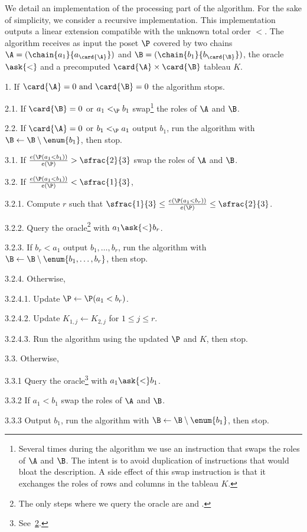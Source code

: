 We detail an implementation of the processing part of the algorithm. For the sake of simplicity,
we consider a recursive implementation. This implementation outputs a linear
extension compatible with the unknown total order \(<\). The algorithm receives as
input the poset \(\P\) covered by two chains \(\A =
(\chain{a_1}{a_{\card{\A}}})\) and \(\B = (\chain{b_1}{b_{\card{\B}}})\), the oracle
\(\ask{<}\) and a precomputed \(\card{\A} \times \card{\B}\) tableau \(K\).
\begin{algorithm}
\item[1.] If \(\card{\A} = 0 \text{ and } \card{\B} = 0\) the algorithm stops.
\item[2.1.] If \(\card{\B} = 0\) or \(a_1 <_{\P} b_1\) swap\footnote{Several times during the algorithm we use an instruction that swaps the
roles of \(\A\) and \(\B\). The intent is to avoid duplication of
instructions that would bloat the description. A side effect of this swap
instruction is that it exchanges
the roles of rows and columns in the tableau \(K\).}
the roles of \(\A\) and \(\B\).
\item[2.2.] If \(\card{\A} = 0\) or \(b_1 <_{\P} a_1\) output
\(b_1\), run the
algorithm with \(\B \gets \B \setminus \enum{b_1}\), then stop.
\item[3.1.] If \(\frac{e(\P(a_1 < b_1))}{e(\P)} > \sfrac{2}{3}\) swap the
roles of \(\A\) and \(\B\).
\item[3.2.] If \(\frac{e(\P(a_1 < b_1))}{e(\P)} < \sfrac{1}{3}\),
\item[3.2.1.] Compute \(r\) such that \(\sfrac{1}{3} \le \frac{e(\P(a_1 < b_r))}{e(\P)} \le \sfrac{2}{3}\).
\item[3.2.2.] Query the oracle\footnote{The only steps where we query the
oracle are  and
.\label{footnote:linial:query}} with \(a_1 \ask{<} b_r\).
\item[3.2.3.] If \(b_r < a_1\) output
\(b_1,\ldots,b_r\), run the algorithm with \(\B \gets \B
\setminus \enum{b_1,\ldots,b_r}\), then stop.
\item[3.2.4.] Otherwise,
\item[3.2.4.1.] Update \(\P \gets \P( a_1 < b_r )\).
\item[3.2.4.2.] Update \(K_{1,j} \gets K_{2,j}\) for \(1 \le j \le r\).
\item[3.2.4.3.] Run the algorithm using the updated \(\P\) and \(K\), then stop.
\item[3.3.] Otherwise,
\item[3.3.1] Query the oracle\footnote{See~\cref{footnote:linial:query}.} with \(a_1 \ask{<} b_1\).
\item[3.3.2] If \(a_1 < b_1\) swap the roles of \(\A\) and \(\B\).
\item[3.3.3] Output \(b_1\), run the algorithm with \(\B \gets \B \setminus
\enum{b_1}\), then stop.
\end{algorithm}


